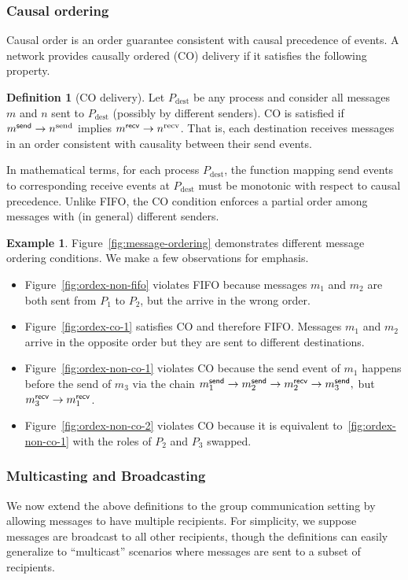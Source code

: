 \documentclass[]             %
{NASA}                       %
\theoremstyle{definition}
\newtheorem{example}[theorem]{Example}
\newtheorem{definition}[theorem]{Definition}
\providecommand{\tightlist}{%
  \setlength{\itemsep}{0pt}\setlength{\parskip}{0pt}}
\begin{document}
\subsubsection{Causal ordering}
Causal order is an order guarantee consistent with causal precedence
of events. A network provides causally ordered (CO) delivery if it
satisfies the following property.
\begin{definition}[CO delivery]
  \label{def:causalorder}
  Let $P_\mathrm{dest}$ be any process and consider all messages $m$
  and $n$ sent to $P_\mathrm{dest}$ (possibly by different senders).
  CO is satisfied if $m_{}^{\mathsf{send}} \to n^\textrm{send}$ implies
  $m_{}^{\mathsf{recv}} \to n^\textrm{recv}$. That is, each destination receives
  messages in an order consistent with causality between their send
  events.
\end{definition}
In mathematical terms, for each process $P_{\mathrm{dest}}$, the
function mapping send events to corresponding receive events at
$P_{\mathrm{dest}}$ must be monotonic with respect to causal
precedence.  Unlike FIFO, the CO condition enforces a partial order
among messages with (in general) different senders.

\begin{example}
  Figure~\ref{fig:message-ordering} demonstrates different message
  ordering conditions. We make a few observations for emphasis.

  \begin{itemize}
    \tightlist
  \item Figure~\ref{fig:ordex-non-fifo} violates FIFO because messages
    $m_1$ and $m_2$ are both sent from $P_1$ to $P_2$, but the arrive
    in the wrong order.
  \item Figure~\ref{fig:ordex-co-1} satisfies CO and therefore FIFO. Messages
    $m_1$ and $m_2$ arrive in the opposite order but they are sent to
    different destinations.
  \item Figure~\ref{fig:ordex-non-co-1} violates CO because the send event of
    $m_1$ happens before the send of $m_3$ via the chain
    $m_{1}^{\mathsf{send}} \to m_{2}^{\mathsf{send}} \to m_{2}^{\mathsf{recv}} \to m_{3}^{\mathsf{send}},$ but
    $m_{3}^{\mathsf{recv}} \to m_{1}^{\mathsf{recv}}$.
  \item Figure~\ref{fig:ordex-non-co-2} violates CO because it is equivalent to~\ref{fig:ordex-non-co-1} with the roles of $P_2$ and $P_3$ swapped.
  \end{itemize}
\end{example}

\subsubsection{Multicasting and Broadcasting}
\label{sssec:multicasting}
We now extend the above definitions to the group communication setting
by allowing messages to have multiple recipients. For simplicity, we
suppose messages are broadcast to all other recipients, though the
definitions can easily generalize to ``multicast'' scenarios where
messages are sent to a subset of recipients.
\end{document}
